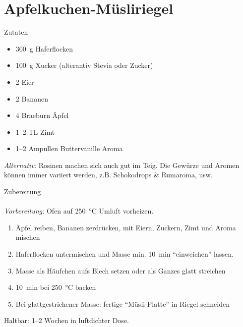 \section*{Apfelkuchen-Müsliriegel}
\ihead{}\ohead{}
\cfoot{}
{\Large Zutaten}
\begin{multicols}{2}
\begin{itemize}
    \item \SI{300}{g} Haferflocken
    \item \SI{100}{g} Xucker (alterantiv Stevia oder Zucker)
    \item \num{2} Eier
    \item \num{2} Bananen
    \item \num{4} Braeburn Äpfel
    \item \numrange{1}{2} TL Zimt
    \item \numrange{1}{2} Ampullen Buttervanille Aroma
\end{itemize}
\textit{Alternativ:}
Rosinen machen sich auch gut im Teig.
Die Gewürze und Aromen können immer variiert werden, z.B. Schokodrops \& Rumaroma, usw.
\end{multicols}
\noindent
{\Large Zubereitung}\\
\\
\textit{Vorbereitung:} Ofen auf \SI{250}{\celsius} Umluft vorheizen.
\begin{enumerate}
    \item Äpfel reiben, Bananen zerdrücken, mit Eiern, Zuckern, Zimt und Aroma mischen
    \item Haferflocken untermischen und Masse min. \SI{10}{min} \enquote{einweichen} lassen.
    \item Masse als Häufchen aufs Blech setzen oder als Ganzes glatt streichen
    \item \SI{10}{min} bei \SI{250}{\celsius} backen
    \item Bei glattgestrichener Masse: fertige \enquote{Müsli-Platte} in Riegel schneiden
\end{enumerate}
Haltbar: \numrange{1}{2} Wochen in luftdichter Dose.